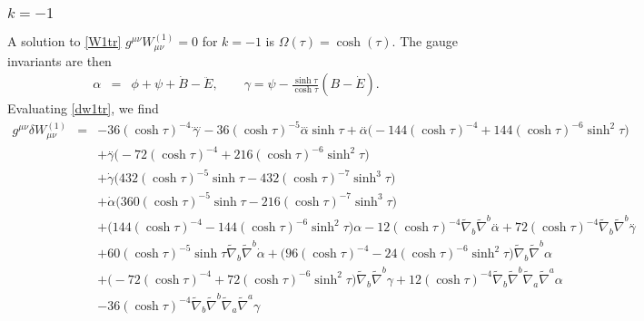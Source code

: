 \documentclass[10pt,letterpaper]{article}
\numberwithin{equation}{section}
\begin{document}
\subsubsection{$k=-1$}
A solution to \eqref{W1tr} $g^{\mu\nu}W_{\mu\nu}^{(1)}=0$ for $k=-1$ is $\Omega(\tau) = \cosh(\tau)$. The gauge invariants are then
\begin{eqnarray}
\alpha &=& \phi + \psi + \dot B - \ddot E,\qquad \gamma = \psi - \frac{\sinh\tau}{\cosh\tau}(B-\dot E).
\end{eqnarray}
Evaluating \eqref{dw1tr}, we find
\begin{eqnarray}
g^{\mu\nu}\delta W_{\mu\nu}^{(1)}&=& -36 (\cosh\tau)^{-4} \overset{....}{\gamma} - 36 (\cosh\tau)^{-5} \overset{...}{\alpha} \sinh\tau + \overset{..}{\alpha} \bigl(-144 (\cosh\tau)^{-4} + 144 (\cosh\tau)^{-6} \sinh^2\tau \bigr) \nonumber \\ 
&& + \overset{..}{\gamma} \bigl(-72 (\cosh\tau)^{-4} + 216 (\cosh\tau)^{-6} \sinh^2\tau \bigr) \nonumber \\ 
&& + \dot{\gamma} \bigl(432 (\cosh\tau)^{-5} \sinh\tau - 432 (\cosh\tau)^{-7} \sinh^3\tau \bigr) \nonumber \\ 
&& + \dot{\alpha} \bigl(360 (\cosh\tau)^{-5} \sinh\tau - 216 (\cosh\tau)^{-7} \sinh^3\tau \bigr) \nonumber \\ 
&& + \bigl(144 (\cosh\tau)^{-4} - 144 (\cosh\tau)^{-6} \sinh^2\tau \bigr) \alpha - 12 (\cosh\tau)^{-4} \tilde{\nabla}_{b}\tilde{\nabla}^{b}\overset{..}{\alpha} + 72 (\cosh\tau)^{-4} \tilde{\nabla}_{b}\tilde{\nabla}^{b}\overset{..}{\gamma} \nonumber \\ 
&& + 60 (\cosh\tau)^{-5} \sinh\tau \tilde{\nabla}_{b}\tilde{\nabla}^{b}\dot{\alpha} + \bigl(96 (\cosh\tau)^{-4} - 24 (\cosh\tau)^{-6} \sinh^2\tau \bigr) \tilde{\nabla}_{b}\tilde{\nabla}^{b}\alpha \nonumber \\ 
&& + \bigl(-72 (\cosh\tau)^{-4} + 72 (\cosh\tau)^{-6} \sinh^2\tau \bigr) \tilde{\nabla}_{b}\tilde{\nabla}^{b}\gamma + 12 (\cosh\tau)^{-4} \tilde{\nabla}_{b}\tilde{\nabla}^{b}\tilde{\nabla}_{a}\tilde{\nabla}^{a}\alpha \nonumber \\ 
&& - 36 (\cosh\tau)^{-4} \tilde{\nabla}_{b}\tilde{\nabla}^{b}\tilde{\nabla}_{a}\tilde{\nabla}^{a}\gamma 
\end{eqnarray}
\end{document}

